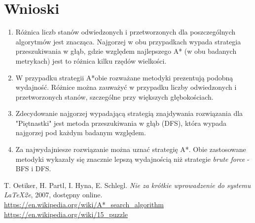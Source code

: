 \documentclass{classrep}
\begin{document}
\newpage
\section{Wnioski}
\begin{enumerate}
\item Różnica liczb stanów odwiedzonych i przetworzonych dla poszczególnych algorytmów jest znacząca. Najgorzej w obu przypadkach wypada strategia przeszukiwania w głąb, gdzie względem najlepszego A* (w obu badanych metrykach) jest to różnica kilku rzędów wielkości.
\item W przypadku strategii A*obie rozważane metodyki prezentują podobną wydajność. Różnice można zauważyć w przypadku liczby odwiedzonych i przetworzonych stanów, szczególne przy większych głębokościach.
\item Zdecydowanie najgorzej wypadającą strategią znajdywania rozwiązania dla "Piętnastki" jest metoda przeszukiwania w głąb (DFS), która wypada najgorzej pod każdym badanym względem.
\item Za najwydajniesze rozwiązanie można uznać strategię A*. Obie zastosowane metodyki wykazały się znacznie lepszą wydajnością niż strategie \textit{brute force} - BFS i DFS.
\end{enumerate}

\begin{thebibliography}{0}
   T. Oetiker, H. Partl, I. Hyna, E. Schlegl.
    \textsl{Nie za krótkie wprowadzenie do systemu \LaTeX2e}, 2007, dostępny
    online.
   \url{https://en.wikipedia.org/wiki/A*_search_algorithm}
   \url{https://en.wikipedia.org/wiki/15_puzzle}
  
\end{thebibliography}
\end{document}
